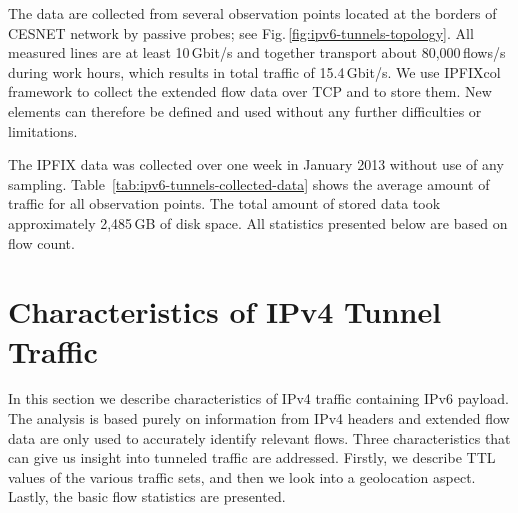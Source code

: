 The data are collected from several observation points located at the borders of CESNET network by passive probes; see Fig.\,\ref{fig:ipv6-tunnels-topology}. All measured lines are at least 10\,Gbit/s and together transport about 80,000\,flows/s during work hours, which results in total traffic of 15.4\,Gbit/s. We use IPFIXcol~\cite{ipfixcol} framework to collect the extended flow data over TCP and to store them. New elements can therefore be defined and used without any further difficulties or limitations.


The IPFIX data was collected over one week in January 2013 without use of any sampling. Table~\ref{tab:ipv6-tunnels-collected-data} shows the average amount of traffic for all observation points. The total amount of stored data took approximately 2,485\,GB of disk space. All statistics presented below are based on flow count.

\section{Characteristics of IPv4 Tunnel Traffic} \label{subsec:ipv6-tunnels-outer-traffic-evaluation}

In this section we describe characteristics of IPv4 traffic containing IPv6 payload. The analysis is based purely on information from IPv4 headers and extended flow data are only used to accurately identify relevant flows. Three characteristics that can give us insight into tunneled traffic are addressed. Firstly, we describe TTL values of the various traffic sets, and then we look into a geolocation aspect. Lastly, the basic flow statistics are presented.

